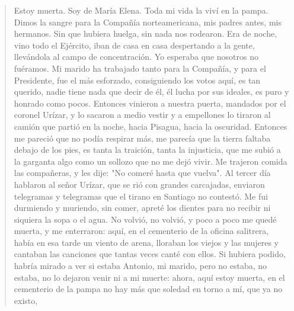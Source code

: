 \documentclass[12pt]{article}
\begin{document}
\clearpage
{}
\begin{verse}
Estoy muerta. Soy de María Elena.  
Toda mi vida la viví en la pampa.  
Dimos la sangre para la Compañía  
norteamericana, mis padres antes, mis hermanos.  
Sin que hubiera huelga, sin nada nos rodearon.  
Era de noche, vino todo el Ejército,  
iban de casa en casa despertando a la gente,  
llevándola al campo de concentración.  
Yo esperaba que nosotros no fuéramos.  
Mi marido ha trabajado tanto para la Compañía,  
y para el Presidente, fue el más esforzado,  
consiguiendo los votos aquí, es tan querido,  
nadie tiene nada que decir de él, él lucha  
por sus ideales, es puro y honrado  
como pocos. Entonces vinieron a nuestra puerta,  
mandados por el coronel Urízar,  
y lo sacaron a medio vestir y a empellones  
lo tiraron al camión que partió en la noche,  
hacia Pisagua, hacia la oscuridad. Entonces  
me pareció que no podía respirar más, me parecía  
que la tierra faltaba debajo de los pies,  
es tanta la traición, tanta la injusticia,  
que me subió a la garganta algo como un sollozo  
que no me dejó vivir. Me trajeron comida  
las compañeras, y les dije: "No comeré hasta que vuelva".  
Al tercer día hablaron al señor Urízar,  
que se rió con grandes carcajadas, enviaron  
telegramas y telegramas que el tirano en Santiago  
no contestó. Me fui durmiendo y muriendo,  
sin comer, apreté los dientes para no recibir  
ni siquiera la sopa o el agua. No volvió, no volvió,  
y poco a poco me quedé muerta, y me enterraron:  
aquí, en el cementerio de la oficina salitrera,  
había en esa tarde un viento de arena,  
lloraban los viejos y las mujeres y cantaban  
las canciones que tantas veces canté con ellos.  
Si hubiera podido, habría mirado a ver si estaba  
Antonio, mi marido, pero no estaba, no estaba,  
no lo dejaron venir ni a mi muerte: ahora,  
aquí estoy muerta, en el cementerio de la pampa  
no hay más que soledad en torno a mí, que ya no existo,  

\end{verse}
\end{document}
